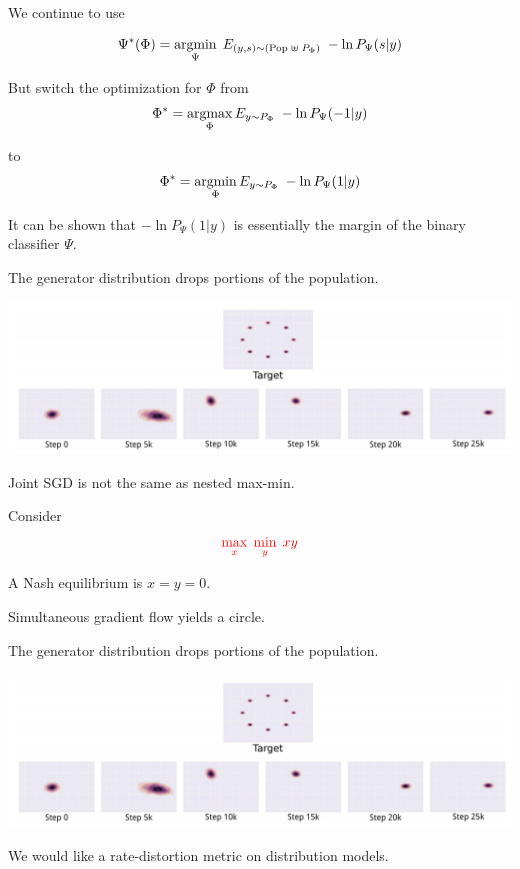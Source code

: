 {We continue to use

$$\Psi^*(\Phi) = \operatorname*{argmin}_\Psi \;E_{(y,s) \sim (\mathrm{Pop}\; \uplus \;P_\Phi)}\;- \ln P_\Psi(s|y)$$

\vfill
But switch the optimization for $\Phi$ from
$$\Phi^* = \operatorname*{argmax}_\Phi E_{y \sim P_\Phi}\; - \ln P_\Psi(-1|y)$$

to
$$\Phi^* = \operatorname*{argmin}_\Phi E_{y \sim P_\Phi}\;- \ln P_\Psi(1|y)$$

\vfill
It can be shown that $- \ln P_\Psi(1|y)$ is essentially the margin of the binary classifier $\Psi$.



The generator distribution drops portions of the population.

\centerline{\includegraphics[width=9in]{../images/Unstable1}}


Joint SGD is not the same as nested max-min.

\vfill
Consider
$${\color{red} \max_x \; \min_y\; xy}$$

\vfill
A Nash equilibrium is $x= y = 0$.

\vfill
Simultaneous gradient flow yields a circle.


The generator distribution drops portions of the population.

\centerline{\includegraphics[width=9in]{../images/Unstable1}}


We would like a rate-distortion metric on distribution models.

}
